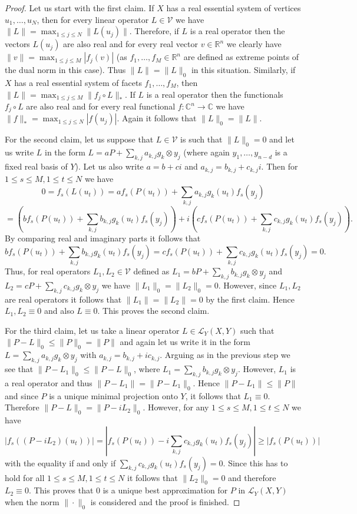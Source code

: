 \documentclass[12pt, reqno]{amsart}
\theoremstyle{definition}
\theoremstyle{remark}
\numberwithin{equation}{section}
\begin{document}
\begin{proof}
Let us start with the first claim. If $X$ has a real essential system of vertices $u_1, \ldots, u_N$, then for every linear operator $L \in \mathcal{V}$ we have $\|L\| = \max_{1 \leq j \leq N} \|L(u_j)\|$. Therefore, if $L$ is a real operator then the vectors $L(u_j)$ are also real and for every real vector $v \in \mathbb{R}^n$ we clearly have $\|v\| = \max_{1 \leq j \leq M} |f_j(v)|$ (as $f_1, \ldots, f_M \in \mathbb{R}^n$ are defined as extreme points of the dual norm in this case). Thus $\|L\|=\|L\|_0$ in this situation. Similarly, if $X$ has a real essential system of facets $f_1, \ldots, f_M$, then $\|L\| = \max_{1 \leq j \leq M} \|f_j \circ L\|_*$. If $L$ is a real operator then the functionals $f_j \circ L$ are also real and for every real functional $f: \mathbb{C}^n \to \mathbb{C}$ we have $\|f\|_* = \max_{1 \leq j \leq N} |f(u_j)|$. Again it follows that $\|L\|_0=\|L\|$.

For the second claim, let us suppose that $L \in \mathcal{V}$ is such that $\|L\|_0=0$ and let us write $L$ in the form $L=aP + \sum_{k, j} a_{k, j} g_k \otimes y_j$ (where again $y_1, \ldots, y_{n-d}$ is a fixed real basis of $Y$). Let us also write $a= b + ci$ and $a_{k, j} = b_{k, j} + c_{k, j}i$. Then for $1 \leq s \leq M, 1 \leq t \leq N$ we have
$$0 = f_s(L(u_t))=af_s(P(u_t)) + \sum _{k, j} a_{k, j} g_k(u_t) f_s(y_j)$$
$$=\left (bf_s(P(u_t)) + \sum _{k, j} b_{k, j} g_k(u_t) f_s(y_j) \right ) + i \left ( cf_s(P(u_t)) + \sum _{k, j} c_{k, j} g_k(u_t) f_s(y_j) \right ) .$$
By comparing real and imaginary parts it follows that
$$bf_s(P(u_t)) + \sum _{k, j} b_{k, j} g_k(u_t) f_s(y_j)  = cf_s(P(u_t)) + \sum _{k, j} c_{k, j} g_k(u_t) f_s(y_j) = 0.$$
Thus, for real operators $L_1, L_2 \in \mathcal{V}$ defined as $L_1 = bP + \sum_{k, j} b_{k, j} g_k \otimes y_j $ and $L_2=cP + \sum_{k, j} c_{k, j} g_k \otimes y_j$ we have $\|L_1\|_0=\|L_2\|_0=0$. However, since $L_1, L_2$ are real operators it follows that $\|L_1\|=\|L_2\|=0$ by the first claim. Hence $L_1, L_2 \equiv 0$ and also $L \equiv 0$. This proves the second claim.

For the third claim, let us take a linear operator $L \in \mathcal{L}_Y(X, Y)$ such that $\|P-L\|_0 \leq \|P\|_0=\|P\|$ and again let us write it in the form $L=\sum_{k, j} a_{k, j} g_k \otimes y_j$ with $a_{k, j} = b_{k, j} + i c_{k, j}$. Arguing as in the previous step we see that $\|P-L_1\|_0 \leq \|P-L\|_0$, where $L_1 = \sum_{k, j} b_{k, j} g_k \otimes y_j$. However, $L_1$ is a real operator and thus $\|P-L_1\|=\|P-L_1\|_0$. Hence $\|P-L_1\| \leq \|P\|$ and since $P$ is a unique minimal projection onto $Y$, it follows that $L_1 \equiv 0$. Therefore $\|P-L\|_0=\|P-iL_2\|_0$. However, for any $1 \leq s \leq M, 1 \leq t \leq N$ we have
$$|f_s((P-iL_2)(u_t))| = \left | f_s(P(u_t)) - i \sum_{k, j} c_{k, j} g_k(u_t) f_s(y_j) \right | \geq |f_s(P(u_t))|$$
with the equality if and only if $\sum_{k, j} c_{k, j} g_k(u_t) f_s(y_j)=0$. Since this has to hold for all $1 \leq s \leq M, 1 \leq t \leq N$ it follows that $\|L_2\|_0=0$ and therefore $L_2 \equiv 0$. This proves that $0$ is a unique best approximation for $P$ in $\mathcal{L}_Y(X, Y)$ when the norm $\| \cdot \|_0$ is considered and the proof is finished.

\end{proof}
\end{document}
